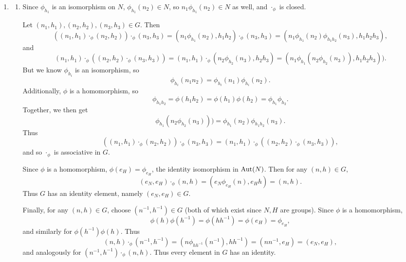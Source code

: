 \documentclass{homework}
\begin{document}
\begin{solution}
  \begin{enumerate}[label=(\alph*)]
    \item
    \begin{enumerate}
      \item Since $\phi_{h_1}$ is an isomorphism on $N$, $\phi_{h_1}(n_2)\in N$, so
        $n_1\phi_{h_1}(n_2)\in N$ as well, and $\cdot_\phi$ is closed.

        Let $(n_1,h_1), (n_2,h_2), (n_3,h_3)\in G$. Then \[
          ((n_1,h_1)\cdot_\phi(n_2,h_2))\cdot_\phi(n_3,h_3)=(n_1\phi_{h_1}(n_2),h_1h_2)\cdot
          _\phi(n_3,h_3)=(n_1\phi_{h_1}(n_2)\phi_{h_1h_2}(n_3),h_1h_2h_3)
        ,\] and \[
          (n_1,h_1)\cdot_\phi((n_2,h_2)\cdot_\phi(n_3,h_3))=(n_1,h_1)\cdot_\phi(n_2\phi_{h_2}(n_3),
          h_2h_3)=(n_1\phi_{h_1}(n_2\phi_{h_2}(n_3)),h_1h_2h_3))
        .\] But we know $\phi_{h_i}$ is an isomorphism, so \[
          \phi_{h_i}(n_1n_2)=\phi_{h_i}(n_1)\phi_{h_i}(n_2)
        .\] Additionally, $\phi$ is a homomorphism, so \[
          \phi_{h_1h_2}=\phi(h_1h_2)=\phi(h_1)\phi(h_2)=\phi_{h_1}\phi_{h_2}
        .\] Together, we then get \[
          \phi_{h_1}(n_2\phi_{h_2}(n_3)))=\phi_{h_1}(n_2)\phi_{h_1h_2}(n_3)
        .\] Thus \[
          ((n_1,h_1)\cdot_\phi(n_2,h_2))\cdot_\phi(n_3,h_3)
          =(n_1,h_1)\cdot_\phi((n_2,h_2)\cdot_\phi(n_3,h_3))
        ,\] and so $\cdot_\phi$ is associative in $G$.

        Since $\phi$ is a homomorphism, $\phi(e_H)=\phi_{e_H}$, the identity isomorphism in
        $\operatorname{Aut}(N)$.  Then for any $(n,h)\in G$, \[
          (e_N,e_H)\cdot_\phi(n,h)=(e_N\phi_{e_H}(n),e_Hh)=(n,h)
        .\] Thus $G$ has an identity element, namely $(e_N,e_H)\in G$.

        Finally, for any $(n,h)\in G$, choose $(n^{-1},h^{-1})\in G$ (both of which exist since $N,H$
        are groups). Since $\phi$ is a homomorphism, \[
          \phi(h)\phi(h^{-1})=\phi(hh^{-1})=\phi(e_H)=\phi_{e_H}
        ,\] and similarly for $\phi(h^{-1})\phi(h)$. Thus \[
          (n,h)\cdot_\phi(n^{-1},h^{-1})=(n\phi_{hh^{-1}}(n^{-1}),hh^{-1})=(nn^{-1},e_H)=(e_N,e_H)
        ,\] and analogously for $(n^{-1},h^{-1})\cdot _\phi(n,h)$. Thus every element in $G$ has an
        identity.


\end{enumerate}
\end{enumerate}
\end{solution}
\end{document}
